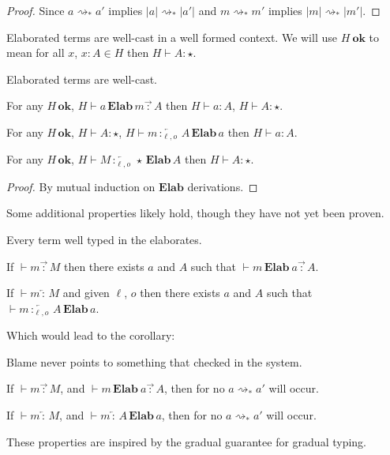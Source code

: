\begin{proof}
Since $a\rightsquigarrow_{*}a'$ implies $|a|\rightsquigarrow_{*}|a'|$ and $m\rightsquigarrow_{*}m'$ implies $|m|\rightsquigarrow_{*}|m'|$.
\end{proof}

Elaborated terms are well-cast in a well formed context.
We will use $H\ \textbf{ok}$ to mean for all $x$, $x : A \in H$ then $H \vdash A : \star$.

\begin{thm} Elaborated terms are well-cast.
 
For any $H\,\textbf{ok}$, $H\vdash a\,\textbf{Elab}\,m\overrightarrow{\,:\,}A$ then $H\vdash a:A$, $H\vdash A:\star$.
 
For any $H\,\textbf{ok}$, $H\vdash A:\star$, $H\vdash m\overleftarrow{\,:_{\ell,o}\,}A\,\textbf{Elab}\,a$ then $H\vdash a:A$.

For any $H\,\textbf{ok}$, $H\vdash M\overleftarrow{\,:_{\ell,o}\,}\star\,\textbf{Elab}\,A$ then $H\vdash A:\star$.
\end{thm}
\begin{proof}
By mutual induction on $\textbf{Elab}$ derivations.
\end{proof}

Some additional properties likely hold, though they have not yet been proven. 

\begin{claim}
Every term well typed in the \bidir{} \slang{} elaborates.
 
 
If $\vdash m\overrightarrow{\,:\,}M$ then there exists $a$ and $A$ such that $\vdash m\,\textbf{Elab}\ a\overrightarrow{\,:\,}A$.
 
If $\vdash m\overleftarrow{\,:\,}M$ and given $\ell$, $o$ then there exists $a$ and $A$ such that $\vdash m \overleftarrow{\,:_{\ell, o}\,}A\,\textbf{Elab}\,a$.
\end{claim}
 
Which would lead to the corollary:

\begin{claim}
Blame never points to something that checked in the \bidir{} system.
 
If $\vdash m\overrightarrow{\,:\,}M$, and $\vdash m\,\textbf{Elab}\ a\overrightarrow{\,:\,}A$, then for no $a\rightsquigarrow_{*}a'$ will  occur.
 
If  $\vdash m\overleftarrow{\,:\,}M$, and $\vdash m \overleftarrow{\,:\,}A\,\textbf{Elab}\,a$, then for no $a\rightsquigarrow_{*}a'$ will  occur.
\end{claim}
 
These properties are inspired by the gradual guarantee\cite{siek_et_al:LIPIcs:2015:5031} for gradual typing.